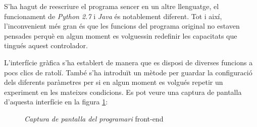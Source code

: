 S'ha hagut de reescriure el programa sencer en un altre llenguatge, el funcionament de \textit{Python \num{2.7}} i \textit{Java} és notablement diferent. Tot i així, l'inconvenient més gran és que les funcions del programa original no estaven pensades perquè en algun moment es volguessin redefinir les capacitats que tingués aquest controlador.

L'interfície gràfica s'ha establert de manera que es disposi de diverses funcions a pocs clics de ratolí. També s'ha introduït un mètode per guardar la configuració dels diferents paràmetres per si en algun moment es volgués repetir un experiment en les mateixes condicions. Es pot veure una captura de pantalla d'aquesta interfície en la figura \ref{fig:programa}:

\begin{figure}[htp]
	\centering
	{
	\setlength{\fboxsep}{0pt}
	\setlength{\fboxrule}{1pt}
	}
	\caption[Captura de pantalla del programari \textit{front-end}]{\textit{Captura de pantalla del programari }front-end}
	\label{fig:programa}
\end{figure}